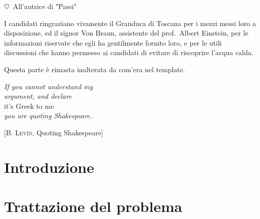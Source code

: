 \documentclass[%
	corpo=11pt,
    twoside,
    stile=classica,
    oldstyle,
    tipotesi=custom,
    greek,
    evenboxes,
]{toptesi}
\begin{document}


\ifclassica%
\begin{dedica}

    $\heartsuit$\ All'autrice di "Passi" %
\end{dedica}

\sommario%






\ringraziamenti%
I candidati ringraziano vivamente il Granduca di Toscana per i mezzi messi loro a disposizione, ed il signor Von Braun, assistente del prof.~Albert Einstein, per le informazioni riservate che egli ha gentilmente fornito loro, e per le utili discussioni che hanno permesso ai candidati di evitare di riscoprire l'acqua calda.

Questa parte è rimasta inalterata da com'era nel template.


\figurespagetrue%

\indici%


\ifclassica   
\begin{citazioni}
    \textit{If you cannot understand my\\argument, and declare}\\
    it's Greek to me\\
    \textit{you are quoting Shakespeare.}
    
    [\textsc{B. Levin}, Quoting Shakespeare]\vspace{1em}
\end{citazioni}
\fi


\mainmatter

\part{Introduzione}



\part{Trattazione del problema}




%
\end{document}
